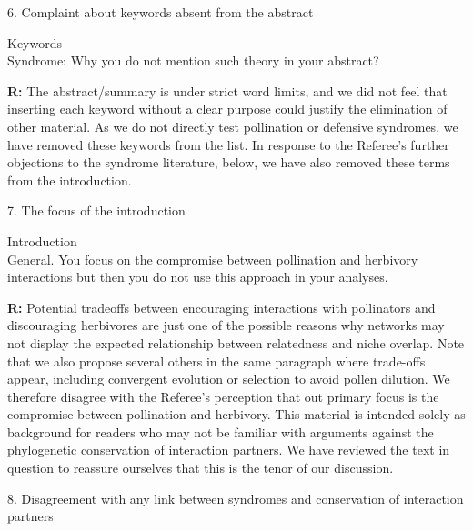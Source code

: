 \documentclass[12pt]{letter}
\newenvironment{refquote}{\bigskip \begin{it}}{\end{it}\smallskip}
\begin{document}
	6. Complaint about keywords absent from the abstract

		\begin{refquote}
		Keywords\\
		Syndrome:  Why you do not mention such theory in your abstract?
		\end{refquote}


		\textbf{R:} The abstract/summary is under strict word limits, and we did not feel that inserting each keyword without a clear purpose could justify the elimination of other material.
		As we do not directly test pollination or defensive syndromes, we have removed these keywords from the list. In response to the Referee's further objections to the syndrome literature, below, we have also removed these terms from the introduction.


	7. The focus of the introduction

		\begin{refquote}
		Introduction\\
		General. You focus on the compromise between pollination and herbivory interactions but then you do not use this approach in your analyses.
		\end{refquote}


		\textbf{R:} Potential tradeoffs between encouraging interactions with pollinators and discouraging herbivores are just one of the possible reasons why networks may not display the expected relationship between relatedness and niche overlap. Note that we also propose several others in the same paragraph where trade-offs appear, including convergent evolution or selection to avoid pollen dilution. We therefore disagree with the Referee's perception that out primary focus is the compromise between pollination and herbivory.
		This material is intended solely as background for readers who may not be familiar with arguments against the phylogenetic conservation of interaction partners. We have reviewed the text in question to reassure ourselves that this is the tenor of our discussion.


	8. Disagreement with any link between syndromes and conservation of interaction partners
\end{document}
